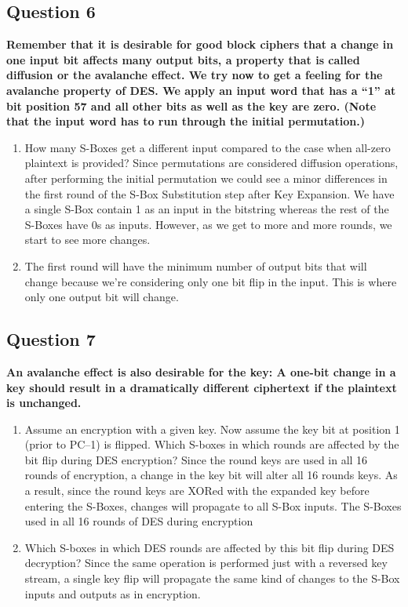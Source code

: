 \documentclass[titlepage]{article}
\begin{document}
{\subsection{Question 6}
{
\textbf{Remember that it is desirable for good block ciphers that a change in one input bit affects many output bits, a property that is called diffusion or the avalanche effect. We try now to get a feeling for the avalanche property of DES. We apply an input word that has a “1” at bit position 57 and all other bits as well as the key are zero. (Note that the input word has to run through the initial permutation.)}
\begin{enumerate}
    \item How many S-Boxes get a different input compared to the case when all-zero plaintext is provided?
    Since permutations are considered diffusion operations, after performing the initial permutation we could see a minor differences in the first round of the S-Box Substitution step after Key Expansion. We have a single S-Box contain 1 as an input in the bitstring whereas the rest of the S-Boxes have 0s as inputs. However, as we get to more and more rounds, we start to see more changes.
    \item The first round will have the minimum number of output bits that will change because we're considering only one bit flip in the input. This is where only one output bit will change.
\end{enumerate}
}
\subsection{Question 7}
{
\textbf{An avalanche effect is also desirable for the key: A one-bit change in a key should result in a dramatically different ciphertext if the plaintext is unchanged.}
\begin{enumerate}
    \item Assume an encryption with a given key. Now assume the key bit at position 1 (prior to PC–1) is flipped. Which S-boxes in which rounds are affected by the bit flip during DES encryption? Since the round keys are used in all 16 rounds of encryption, a change in the key bit will alter all 16 rounds keys. As a result, since the round keys are XORed with the expanded key before entering the S-Boxes, changes will propagate to all S-Box inputs. The S-Boxes used in all 16 rounds of DES during encryption
    \item Which S-boxes in which DES rounds are affected by this bit flip during DES decryption? Since the same operation is performed just with a reversed key stream, a single key flip will propagate the same kind of changes to the S-Box inputs and outputs as in encryption.
\end{enumerate}
}
\clearpage
}
\end{document}
